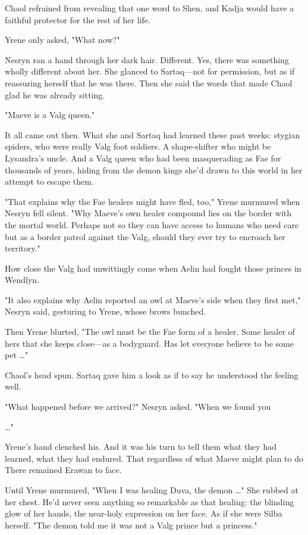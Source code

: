 Chaol refrained from revealing that one word to Shen, and Kadja would have a faithful protector for the rest of her life.

Yrene only asked, "What now?"

Nesryn ran a hand through her dark hair. Different. Yes, there was something wholly different about her. She glanced to Sartaq---not for permission, but  as if reassuring herself that he was there. Then she said the words that made Chaol glad he was already sitting.

"Maeve is a Valg queen."

It all came out then. What she and Sartaq had learned these past weeks:
stygian spiders, who were really Valg foot soldiers. A shape-shifter who might be Lysandra's uncle. And a Valg queen who had been masquerading as Fae for thousands of years, hiding from the demon kings she'd drawn to this world in her attempt to escape them.

"That explains why the Fae healers might have fled, too," Yrene murmured when Nesryn fell silent. "Why Maeve's own healer compound lies on the border with the mortal world. Perhaps not so they can have access to humans who need care  but as a border patrol against the Valg, should they ever try to encroach her territory."

How close the Valg had unwittingly come when Aelin had fought those princes in Wendlyn.

"It also explains why Aelin reported an owl at Maeve's side when they first met," Nesryn said, gesturing to Yrene, whose brows bunched.

Then Yrene blurted, "The owl must be the Fae form of a healer. Some healer of hers that she keeps close---as a bodyguard. Has let everyone believe to be some pet \ldots"

Chaol's head spun. Sartaq gave him a look as if to say he understood the feeling well.

"What happened before we arrived?" Nesryn asked. "When we found you

\ldots"

Yrene's hand clenched his. And it was his turn to tell them what they had learned, what they had endured. That regardless of what Maeve might plan to do  There remained Erawan to face.

Until Yrene murmured, "When I was healing Duva, the demon \ldots" She rubbed at her chest. He'd never seen anything so remarkable as that healing: the blinding glow of her hands, the near-holy expression on her face. As if she were Silba herself. "The demon told me it was not a Valg prince  but a princess."

